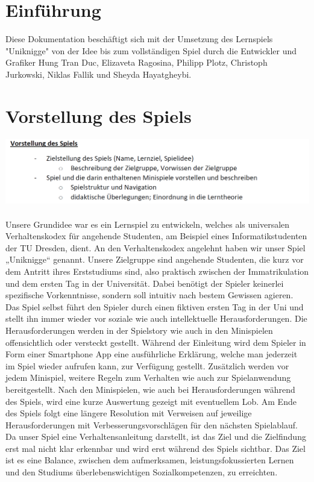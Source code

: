 \documentclass[a4paper, 11pt]{article} %
\begin{document}

\newpage
\renewcommand{\contentsname}{Inhaltsverzeichnis}
\tableofcontents

\newpage
\section{Einführung}
Diese Dokumentation beschäftigt sich mit der Umsetzung des Lernspiels "Uniknigge" von der Idee bis zum vollständigen Spiel durch die Entwickler und Grafiker Hung Tran Duc, Elizaveta Ragosina, Philipp Plotz, Christoph Jurkowski, Niklas Fallik und Sheyda Hayatgheybi.

\section{Vorstellung des Spiels}
\includegraphics[scale=0.5]{images/vorstellung.png}\\\\
Unsere Grundidee war es ein Lernspiel zu entwickeln, welches als universalen Verhaltenskodex für angehende Studenten, am Beispiel eines Informatikstudenten der TU Dresden, dient. An den Verhaltenskodex angelehnt haben wir unser Spiel „Uniknigge“ genannt. Unsere Zielgruppe sind angehende Studenten, die kurz vor dem Antritt ihres Erststudiums sind, also praktisch zwischen der Immatrikulation und dem ersten Tag in der Universität. Dabei benötigt der Spieler keinerlei spezifische Vorkenntnisse, sondern soll intuitiv nach bestem Gewissen agieren. \\

Das Spiel selbst führt den Spieler durch einen fiktiven ersten Tag in der Uni und stellt ihn immer wieder vor soziale wie auch intellektuelle Herausforderungen. Die Herausforderungen werden in der Spielstory wie auch in den Minispielen offensichtlich oder versteckt gestellt. Während der Einleitung wird dem Spieler in Form einer Smartphone App eine ausführliche Erklärung, welche man jederzeit im Spiel wieder aufrufen kann, zur Verfügung gestellt. Zusätzlich werden vor jedem Minispiel, weitere Regeln zum Verhalten wie auch zur Spielanwendung bereitgestellt. Nach den Minispielen, wie auch bei Herausforderungen während des Spiels, wird eine kurze Auswertung gezeigt mit eventuellem Lob. Am Ende des Spiels folgt eine längere Resolution mit Verweisen auf jeweilige Herausforderungen mit Verbesserungsvorschlägen für den nächsten Spielablauf. Da unser Spiel eine Verhaltensanleitung darstellt, ist das Ziel und die Zielfindung erst mal nicht klar erkennbar und wird erst während des Spiels sichtbar.
Das Ziel ist es eine Balance, zwischen dem aufmerksamen, leistungsfokussierten Lernen und den Studiums überlebenswichtigen Sozialkompetenzen, zu erreichten.
\end{document}
